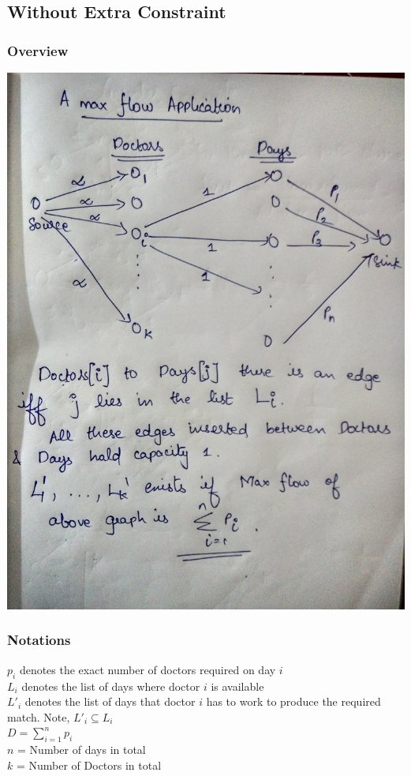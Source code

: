 \documentclass{article}
\begin{document}
\subsection{Without Extra Constraint}
\subsubsection{Overview}
\includegraphics[scale=0.15]{3a.jpg}
\subsubsection{Notations}
$p_i$ denotes the exact number of doctors required on day $i$ \\
$L_i$ denotes the list of days where doctor $i$ is available \\
$L'_i$ denotes the list of days that doctor $i$ has to work to produce the required match. Note, $L'_i \subseteq L_i$\\
$D = \sum_{i=1}^{n} p_i$ \\
$n$ = Number of days in total \\
$k$ = Number of Doctors in total \\ 
\end{document}

